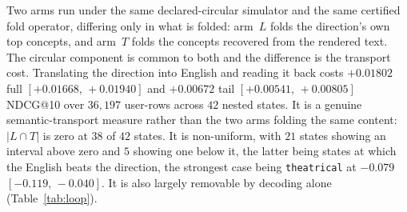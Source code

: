 \documentclass[11pt]{article}
\begin{document}
Two arms run under the same declared-circular simulator and the same certified fold operator,
differing only in what is folded: arm~$L$ folds the direction's own top concepts, and arm~$T$ folds
the concepts recovered from the rendered text. The circular component is common to both and the
difference is the transport cost. Translating the direction into English and reading it back costs
$+0.01802$ full $[+0.01668,\,+0.01940]$ and $+0.00672$ tail $[+0.00541,\,+0.00805]$ NDCG@10 over
$36{,}197$ user-rows across $42$ nested states. It is a genuine semantic-transport measure rather than
the two arms folding the same content: $|L\cap T|$ is zero at $38$ of $42$ states. It is non-uniform,
with $21$ states showing an interval above zero and $5$ showing one below it, the latter being states
at which the English beats the direction, the strongest case being \texttt{theatrical} at $-0.079$
$[-0.119,\,-0.040]$. It is also largely removable by decoding alone (Table~\ref{tab:loop}).
\end{document}
